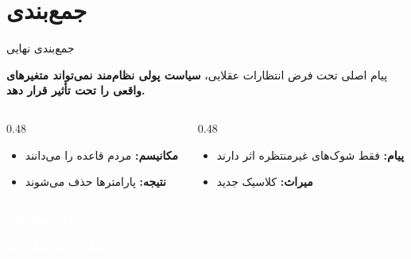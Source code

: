 \documentclass[aspectratio=169,11pt]{beamer}
\newcommand{\important}[1]{\textcolor{AlertRed}{\textbf{#1}}}
\newcommand{\keyword}[1]{\textcolor{MainBlue}{\textbf{#1}}}
\begin{document}
\section{جمع‌بندی}

\begin{frame}{جمع‌بندی نهایی}
	\begin{block}{پیام اصلی}
		\centering
		\large
		تحت فرض انتظارات عقلایی، \important{سیاست پولی نظام‌مند نمی‌تواند متغیرهای واقعی را تحت تأثیر قرار دهد.}
	\end{block}
	\vspace{0.5cm}
	\begin{LTR}
		\begin{columns}[T]
			\begin{column}{0.48\textwidth}
				\begin{RTL}
					\begin{itemize}
						\item \keyword{مکانیسم:} مردم قاعده را می‌دانند
						\item \keyword{نتیجه:} پارامترها حذف می‌شوند
					\end{itemize}
				\end{RTL}
			\end{column}
			\hfill
			\begin{column}{0.48\textwidth}
				\begin{RTL}
					\begin{itemize}
						\item \keyword{پیام:} فقط شوک‌های غیرمنتظره اثر دارند
						\item \keyword{میراث:} کلاسیک جدید
					\end{itemize}
				\end{RTL}
			\end{column}
		\end{columns}
	\end{LTR}
\end{frame}

\begin{frame}[standout]
	\centering
	\Huge
	\textcolor{white}{پایان مقاله اول}
	\vspace{0.5cm}

	\large
	\textcolor{white}{آماده برای مقاله دوم:}\\
	\textcolor{AccentOrange}{}
\end{frame}
\end{document}
